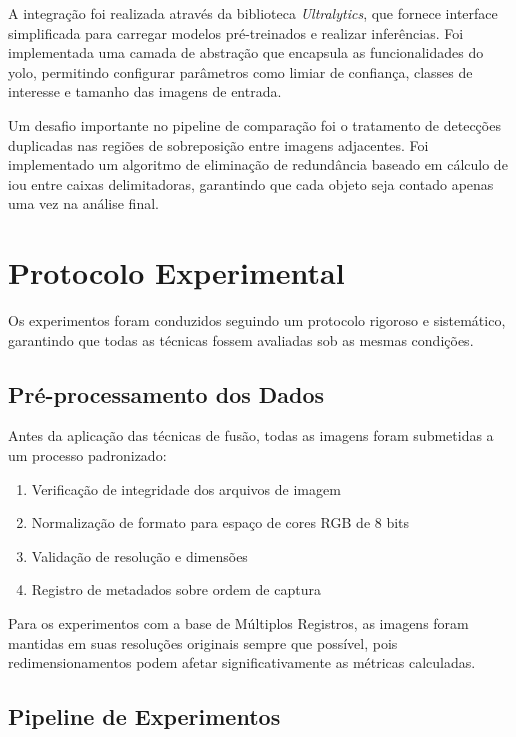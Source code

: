A integração foi realizada através da biblioteca \textit{Ultralytics}, que fornece interface simplificada para carregar modelos pré-treinados e realizar inferências. Foi implementada uma camada de abstração que encapsula as funcionalidades do \gls{yolo}, permitindo configurar parâmetros como limiar de confiança, classes de interesse e tamanho das imagens de entrada.

Um desafio importante no pipeline de comparação foi o tratamento de detecções duplicadas nas regiões de sobreposição entre imagens adjacentes. Foi implementado um algoritmo de eliminação de redundância baseado em cálculo de \gls{iou} entre caixas delimitadoras, garantindo que cada objeto seja contado apenas uma vez na análise final.

\section{Protocolo Experimental}

Os experimentos foram conduzidos seguindo um protocolo rigoroso e sistemático, garantindo que todas as técnicas fossem avaliadas sob as mesmas condições.

\subsection{Pré-processamento dos Dados}

Antes da aplicação das técnicas de fusão, todas as imagens foram submetidas a um processo padronizado:

\begin{enumerate}
    \item Verificação de integridade dos arquivos de imagem
    \item Normalização de formato para espaço de cores RGB de 8 bits
    \item Validação de resolução e dimensões
    \item Registro de metadados sobre ordem de captura
\end{enumerate}

Para os experimentos com a base de Múltiplos Registros, as imagens foram mantidas em suas resoluções originais sempre que possível, pois redimensionamentos podem afetar significativamente as métricas calculadas.

\subsection{Pipeline de Experimentos}

